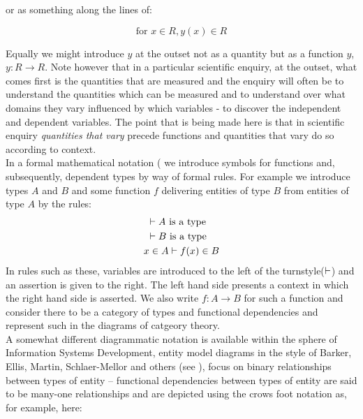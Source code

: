 \documentclass[10pt,a4paper]{scrartcl}
\begin{document}
\noindent or as something along the lines of:

\begin{equation*}
\text{for } x \in R,  y(x) \in R
\end{equation*}

\noindent Equally we might introduce $y$ at the outset not as a quantity but as a function $y$, $y: R \rightarrow R$. Note however that in a particular scientific enquiry, at the outset, what comes first is the quantities that are measured and the enquiry will often be to understand the quantities which can be measured and to understand over what domains they vary influenced by which variables - to discover the independent and dependent variables.
The point that is being made here is that in scientific enquiry \textit{quantities that vary} precede functions and quantities that vary do so according to context. \\

\noindent In a formal mathematical notation (\cite{Cartmell86} we introduce symbols for functions and, subsequently, dependent types by way of formal rules. For example we 
introduce types $A$ and $B$ and some function $f$ delivering entities of type $B$ from entities of type $A$ by the rules:
\begin{align}
&\text{                                  }\vdash A\mbox{ is a type} \\
&\text{                                  }\vdash B\mbox{ is a type} \\
&x \in A \vdash f(x) \in B 
\end{align}
\noindent In rules such as these, variables are introduced to the left of the turnstyle($\vdash$) and 
an assertion is given to the right. The left hand side presents a context in which the right hand side is asserted. 
We also write $f: A \rightarrow B$ for such a function and consider there to be a category of types and functional dependencies and represent such in the diagrams of catgeory theory. \\

\noindent
A somewhat different diagrammatic notation is available within the sphere of Information Systems Development,  entity model diagrams in the style of Barker, Ellis, Martin, Schlaer-Mellor and others (see \cite{Rock-Evans1989}), focus  on binary relationships between types of entity --
functional dependencies between types of entity are said to be many-one relationships and are depicted using the crows foot notation as, for example, here:
\end{document}
